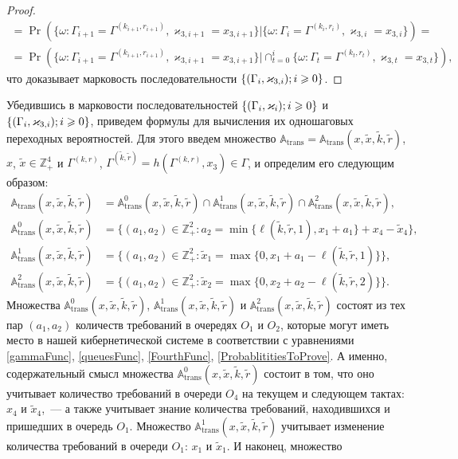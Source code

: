 \begin{proof}
\begin{multline*}
=\Pr (\{\omega\colon   \Gamma_{i+1} =\Gamma^{(k_{i+1},  r_{i+1})},  \varkappa_{3,  i+1} = x_{3,  i+1}\} |\{\omega\colon  \Gamma_i=\Gamma^{(k_i,  r_i)},   \varkappa_{3,  i}=x_{3,  i}\}) = \\
=\Pr (\{\omega\colon \Gamma_{i+1} =\Gamma^{(k_{i+1},  r_{i+1})},  \varkappa_{3,  i+1} = x_{3,  i+1}\} |\cap_{t=0}^{i}\{ \omega\colon \Gamma_t=\Gamma^{(k_t,  r_t)},   \varkappa_{3,  t}=x_{3,  t}\}),  
\end{multline*}
что доказывает марковость последовательности $\MarkThree$.
\end{proof}

Убедившись в марковости последовательностей $\Mark$ и $\MarkThree$,   приведем формулы для вычисления их одношаговых переходных вероятностей. Для этого введем множество ${\mathbb A}_{\mathrm{trans}} = {\mathbb A}_{\mathrm{trans}}(x,  \tilde{x},  \tilde{k},  \tilde{r})$,   $x$,   $\tilde{x}\in \mathbb{Z}_+^4$ и $\Gamma^{(k,  r)}$,   $\Gamma^{(\tilde{k},  \tilde{r})}=h(\Gamma^{(k,  r)},  x_3) \in \Gamma$,    и определим его следующим образом:
\begin{align}
{\mathbb A}_{\mathrm{trans}}(x,  \tilde{x},  \tilde{k},  \tilde{r}) &= {\mathbb A}_{\mathrm{trans}}^0(x,  \tilde{x},  \tilde{k},  \tilde{r}) \cap {\mathbb A}_{\mathrm{trans}}^1(x,  \tilde{x},  \tilde{k},  \tilde{r})\cap {\mathbb A}_{\mathrm{trans}}^2(x,  \tilde{x},  \tilde{k},  \tilde{r}),  \label{A:trans:1}\\
{\mathbb A}_{\mathrm{trans}}^0(x,  \tilde{x},  \tilde{k},  \tilde{r}) &= \{(a_1,  a_2) \in \mathbb{Z}_+^2 \colon a_2 = \min{\{\ell(\tilde{k},  \tilde{r},  1),   x_1+a_1}\} +x_4-\tilde{x}_4\},  \\
{\mathbb A}_{\mathrm{trans}}^1(x,  \tilde{x},  \tilde{k},  \tilde{r}) &= \{(a_1,  a_2) \in \mathbb{Z}_+^2 \colon \tilde{x}_1=\max{\{0,  x_1+a_1-\ell(\tilde{k},  \tilde{r},  1)\}}\},  \\
{\mathbb A}_{\mathrm{trans}}^2(x,  \tilde{x},  \tilde{k},  \tilde{r}) &= \{(a_1,  a_2) \in \mathbb{Z}_+^2 \colon  \tilde{x}_2=\max{\{0,  x_2+a_2-\ell(\tilde{k},  \tilde{r},  2)\}}\}.\label{A:trans:2}
\end{align}
Множества ${\mathbb A}_{\mathrm{trans}}^0(x,  \tilde{x},  \tilde{k},  \tilde{r})$,   ${\mathbb A}_{\mathrm{trans}}^1(x,  \tilde{x},  \tilde{k},  \tilde{r})$ и ${\mathbb A}_{\mathrm{trans}}^2(x,  \tilde{x},  \tilde{k},  \tilde{r})$ состоят из тех пар $(a_1,  a_2)$ количеств требований в очередях $O_1$ и $O_2$,   которые могут иметь место в нашей кибернетической системе в соответствии с уравнениями \eqref{gammaFunc},   \eqref{queuesFunc},   \eqref{FourthFunc},   \eqref{ProbablititiesToProve}. А именно,   содержательный смысл множества  ${\mathbb A}_{\mathrm{trans}}^0(x,  \tilde{x},  \tilde{k},  \tilde{r})$ состоит в том,   что оно учитывает количество требований в очереди $O_4$ на текущем и следующем тактах: $x_4$ и $\tilde{x}_4$,~--- а также учитывает знание количества требований,  находившихся и пришедших в очередь $O_1$. Множество ${\mathbb A}_{\mathrm{trans}}^1(x,  \tilde{x},  \tilde{k},  \tilde{r})$ учитывает изменение количества требований в очереди $O_1$: $x_1$ и $\tilde{x}_1$. И наконец,   множество 
